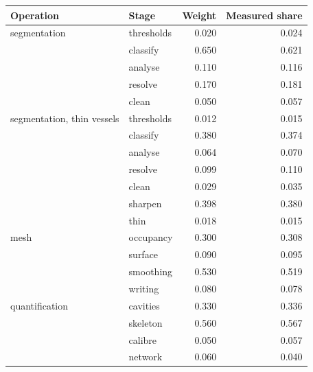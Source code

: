 \begin{tabular}{llrr}
\toprule
Operation & Stage & Weight & Measured share \\
\midrule
segmentation & thresholds & 0.020 & 0.024 \\
 & classify & 0.650 & 0.621 \\
 & analyse & 0.110 & 0.116 \\
 & resolve & 0.170 & 0.181 \\
 & clean & 0.050 & 0.057 \\
segmentation, thin vessels & thresholds & 0.012 & 0.015 \\
 & classify & 0.380 & 0.374 \\
 & analyse & 0.064 & 0.070 \\
 & resolve & 0.099 & 0.110 \\
 & clean & 0.029 & 0.035 \\
 & sharpen & 0.398 & 0.380 \\
 & thin & 0.018 & 0.015 \\
mesh & occupancy & 0.300 & 0.308 \\
 & surface & 0.090 & 0.095 \\
 & smoothing & 0.530 & 0.519 \\
 & writing & 0.080 & 0.078 \\
quantification & cavities & 0.330 & 0.336 \\
 & skeleton & 0.560 & 0.567 \\
 & calibre & 0.050 & 0.057 \\
 & network & 0.060 & 0.040 \\
\bottomrule
\end{tabular}
